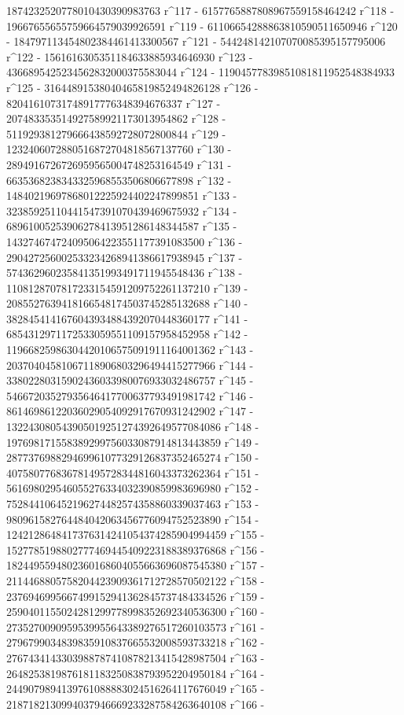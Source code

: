        1874232520778010430390983763 r^117 - 
       6157765887808967559158464242 r^118 - 
       19667655655759664579039926591 r^119 - 
       61106654288863810590511650946 r^120 - 
       184797113454802384461413300567 r^121 - 
       544248142107070085395157795006 r^122 - 
       1561616305351184633885934646930 r^123 - 
       4366895425234562832000375583044 r^124 - 
       11904577839851081811952548384933 r^125 - 
       31644891538040465819852494826128 r^126 - 
       82041610731748917776348394676337 r^127 - 
       207483353514927589921173013954862 r^128 - 
       511929381279666438592728072800844 r^129 - 
       1232406072880516872704818567137760 r^130 - 
       2894916726726959565004748253164549 r^131 - 
       6635368238343325968553506806677898 r^132 - 
       14840219697868012225924402247899851 r^133 - 
       32385925110441547391070439469675932 r^134 - 
       68961005253906278413951286148344587 r^135 - 
       143274674724095064223551177391083500 r^136 - 
       290427256002533234268941386617938945 r^137 - 
       574362960235841351993491711945548436 r^138 - 
       1108128707817233154591209752261137210 r^139 - 
       2085527639418166548174503745285132688 r^140 - 
       3828454141676043934884392070448360177 r^141 - 
       6854312971172533059551109157958452958 r^142 - 
       11966825986304420106575091911164001362 r^143 - 
       20370404581067118906803296494415277966 r^144 - 
       33802280315902436033980076933032486757 r^145 - 
       54667203527935646417700637793491981742 r^146 - 
       86146986122036029054092917670931242902 r^147 - 
       132243080543905019251274392649577084086 r^148 - 
       197698171558389299756033087914813443859 r^149 - 
       287737698829469961077329126837352465274 r^150 - 
       407580776836781495728344816043373262364 r^151 - 
       561698029546055276334032390859983696980 r^152 - 
       752844106452196274482574358860339037463 r^153 - 
       980961582764484042063456776094752523890 r^154 - 
       1242128648417376314241054374285904994459 r^155 - 
       1527785198802777469445409223188389376868 r^156 - 
       1824495594802360168604055663696087545380 r^157 - 
       2114468805758204423909361712728570502122 r^158 - 
       2376946995667499152941362845737484334526 r^159 - 
       2590401155024281299778998352692340536300 r^160 - 
       2735270090959539955643389276517260103573 r^161 - 
       2796799034839835910837665532008593733218 r^162 - 
       2767434143303988787410878213415428987504 r^163 - 
       2648253819876181183250838793952204950184 r^164 - 
       2449079894139761088883024516264117676049 r^165 - 
       2187182130994037946669233287584263640108 r^166 - 
